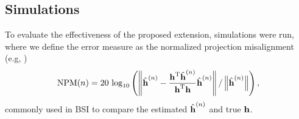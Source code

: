\documentclass{article}
\begin{document}
\subsection[]{Simulations}
To evaluate the effectiveness of the proposed extension, simulations were run, where we define the error measure as the normalized projection misalignment (e.g, \cite{huangAdaptiveMultichannelLeast2002,huangClassFrequencydomainAdaptive2003,habetsOnlineQuasiNewtonAlgorithm2010})
\begin{equation}
        \text{NPM}(n) = 20\,\log_{10} \left(\left\| \hat{\bm{\mathrm{h}}}^{(n)} - \frac{\bm{\mathrm{h}}^{\mathrm{T}} \hat{\bm{\mathrm{h}}}^{(n)}}{\bm{\mathrm{h}}^{\mathrm{T}} \bm{\mathrm{h}}}\hat{\bm{\mathrm{h}}}^{(n)} \right\| / \left\|\hat{\bm{\mathrm{h}}}^{(n)}\right\|\right),
\end{equation}
commonly used in BSI to compare the estimated \(\hat{\bm{\mathrm{h}}}^{(n)}\) and true \(\bm{\mathrm{h}}\).
\end{document}
